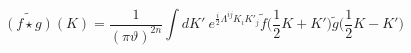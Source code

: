 \begin{equation}\label{eq274:ps}
	\widetilde{(f\star g)}(K)=\frac{1}{(\pi\vartheta)^{2n}}\int dK'~ e^{\frac{i}{2}\Lambda^{ij}K_{i}K'_{j}}\widetilde{f}\Big(\frac{1}{2}K+K'\Big)\widetilde{g}\Big(\frac{1}{2}K-K'\Big)
\end{equation}

